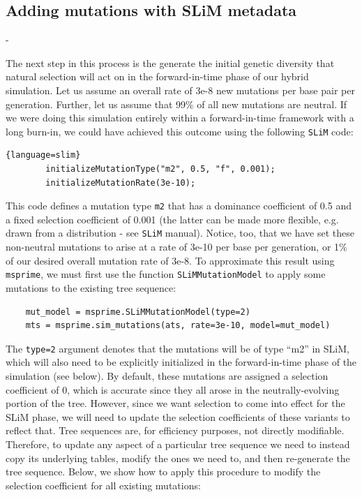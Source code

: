 \documentclass[12pt]{article}
\newcommand{\msprime}[0]{\texttt{msprime}\xspace}
\newcommand{\slim}[0]{\texttt{SLiM}\xspace}
\begin{document}
\subsection*{Adding mutations with SLiM metadata}-

The next step in this process is the generate the initial genetic diversity that natural selection will act on
in the forward-in-time phase of our hybrid simulation. Let us assume an overall rate of 3e-8 new
mutations per base pair per generation. Further, let us assume that 99\% of all new mutations
are neutral. If we were doing this simulation entirely within a forward-in-time framework with a long
burn-in, we could have achieved this outcome using the following \slim code:

\begin{lstlisting}{language=slim}
        initializeMutationType("m2", 0.5, "f", 0.001);
        initializeMutationRate(3e-10);
\end{lstlisting}

This code defines a mutation type \verb|m2| that has a dominance coefficient of 0.5 and a fixed selection
coefficient of 0.001 (the latter can be made more flexible, e.g. drawn from a distribution - see \slim manual).
Notice, too, that we have set these non-neutral mutations to arise at a rate of 3e-10 per base per generation,
or 1\% of our desired overall mutation rate of 3e-8. To approximate this result using \msprime, we must first
use the function \verb|SLiMMutationModel| to apply some mutations to the existing tree sequence:

\begin{listing}[H]
  \begin{verbatim}
    mut_model = msprime.SLiMMutationModel(type=2)
    mts = msprime.sim_mutations(ats, rate=3e-10, model=mut_model)
  \end{verbatim}
\end{listing}

The \verb|type=2| argument denotes that the mutations will be of type ``m2'' in SLiM, which will also
need to be explicitly initialized in the forward-in-time phase of the simulation (see below).
By default, these mutations are assigned a selection coefficient of 0, which is accurate since they
all arose in the neutrally-evolving portion of the tree. However, since we want selection to come into
effect for the SLiM phase, we will need to update the selection coefficients of these variants to reflect that.
Tree sequences are, for efficiency purposes, not directly modifiable. Therefore, to update any aspect of
a particular tree sequence we need to instead copy its underlying tables, modify the ones we need to,
and then re-generate the tree sequence. Below, we show how to apply this procedure to modify the
selection coefficient for all existing mutations:
\end{document}
